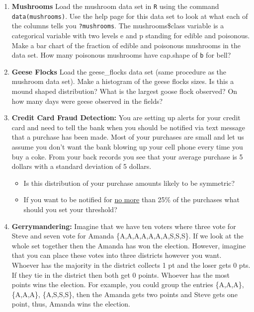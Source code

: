 \documentclass[
]{book}
\providecommand{\tightlist}{%
  \setlength{\itemsep}{0pt}\setlength{\parskip}{0pt}}
\theoremstyle{definition}
\theoremstyle{definition}
\theoremstyle{definition}
\theoremstyle{definition}
\theoremstyle{remark}
\begin{document}
\begin{enumerate}
\def\labelenumi{\arabic{enumi}.}
\item
  \textbf{Mushrooms} Load the mushroom data set in \texttt{R} using the command \texttt{data(mushrooms)}. Use the help page for this data set to look at what each of the columns tells you \texttt{?mushrooms}. The mushrooms\$class variable is a categorical variable with two levels e and p standing for edible and poisonous. Make a bar chart of the fraction of edible and poisonous mushrooms in the data set. How many poisonous mushrooms have cap.shape of \texttt{b} for bell?
\item
  \textbf{Geese Flocks} Load the geese\_flocks data set (same procedure as the mushroom data set). Make a histogram of the geese flocks sizes. Is this a mound shaped distribution? What is the largest goose flock observed? On how many days were geese observed in the fields?
\item
  \textbf{Credit Card Fraud Detection:} You are setting up alerts for your credit card and need to tell the bank when you should be notified via text message that a purchase has been made. Most of your purchases are small and let us assume you don't want the bank blowing up your cell phone every time you buy a coke. From your back records you see that your average purchase is 5 dollars with a standard deviation of 5 dollars.

  \begin{itemize}
  \tightlist
  \item
    Is this distribution of your purchase amounts likely to be symmetric?
  \item
    If you want to be notified for \underline{no more} than 25\% of the purchases what should you set your threshold?
  \end{itemize}
\item
  \textbf{Gerrymandering:} Imagine that we have ten voters where three vote for Steve and seven vote for Amanda \{A,A,A,A,A,A,A,S,S,S\}. If we look at the whole set together then the Amanda has won the election. However, imagine that you can place these votes into three districts however you want. Whoever has the majority in the district collects 1 pt and the loser gets 0 pts. If they tie in the district then both get 0 points. Whoever has the most points wins the election.
  For example, you could group the entries \{A,A,A\}, \{A,A,A\}, \{A,S,S,S\}, then the Amanda gets two points and Steve gets one point, thus, Amanda wins the election.


\end{enumerate}
\end{document}

